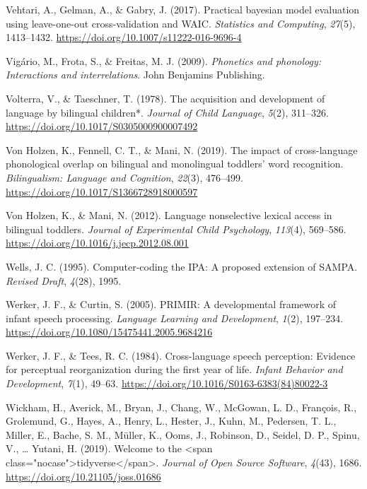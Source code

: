 \documentclass[
  man,
  floatsintext,
  colorlinks=true,linkcolor=blue,citecolor=blue,urlcolor=blue,biblatex]{apa7}
\newlength{\cslhangindent}
\newlength{\cslentryspacingunit} %
\newenvironment{CSLReferences}[2] %
 {%
  \setlength{\parindent}{0pt}
  \ifodd #1
  \let\oldpar\par
  \def\par{\hangindent=\cslhangindent\oldpar}
  \fi
  \setlength{\parskip}{#2\cslentryspacingunit}
 }%
 {}
\begin{document}
\begin{CSLReferences}{1}{0}
\leavevmode{}%
Vehtari, A., Gelman, A., \& Gabry, J. (2017). Practical bayesian model
evaluation using leave-one-out cross-validation and {WAIC}.
\emph{Statistics and Computing}, \emph{27}(5), 1413--1432.
\url{https://doi.org/10.1007/s11222-016-9696-4}

\leavevmode{}%
Vigário, M., Frota, S., \& Freitas, M. J. (2009). \emph{Phonetics and
phonology: Interactions and interrelations}. John Benjamins Publishing.

\leavevmode{}%
Volterra, V., \& Taeschner, T. (1978). The acquisition and development
of language by bilingual children*. \emph{Journal of Child Language},
\emph{5}(2), 311--326. \url{https://doi.org/10.1017/S0305000900007492}

\leavevmode{}%
Von Holzen, K., Fennell, C. T., \& Mani, N. (2019). The impact of
cross-language phonological overlap on bilingual and monolingual
toddlers' word recognition. \emph{Bilingualism: Language and Cognition},
\emph{22}(3), 476--499. \url{https://doi.org/10.1017/S1366728918000597}

\leavevmode{}%
Von Holzen, K., \& Mani, N. (2012). Language nonselective lexical access
in bilingual toddlers. \emph{Journal of Experimental Child Psychology},
\emph{113}(4), 569--586.
\url{https://doi.org/10.1016/j.jecp.2012.08.001}

\leavevmode{}%
Wells, J. C. (1995). Computer-coding the {IPA}: A proposed extension of
{SAMPA}. \emph{Revised Draft}, \emph{4}(28), 1995.

\leavevmode{}%
Werker, J. F., \& Curtin, S. (2005). {PRIMIR}: A developmental framework
of infant speech processing. \emph{Language Learning and Development},
\emph{1}(2), 197--234.
\url{https://doi.org/10.1080/15475441.2005.9684216}

\leavevmode{}%
Werker, J. F., \& Tees, R. C. (1984). Cross-language speech perception:
Evidence for perceptual reorganization during the first year of life.
\emph{Infant Behavior and Development}, \emph{7}(1), 49--63.
\url{https://doi.org/10.1016/S0163-6383(84)80022-3}

\leavevmode{}%
Wickham, H., Averick, M., Bryan, J., Chang, W., McGowan, L. D.,
François, R., Grolemund, G., Hayes, A., Henry, L., Hester, J., Kuhn, M.,
Pedersen, T. L., Miller, E., Bache, S. M., Müller, K., Ooms, J.,
Robinson, D., Seidel, D. P., Spinu, V., \ldots{} Yutani, H. (2019).
Welcome to the {\textless{}}span
class="nocase"{\textgreater{}}tidyverse{\textless{}}/span{\textgreater{}}.
\emph{Journal of Open Source Software}, \emph{4}(43), 1686.
\url{https://doi.org/10.21105/joss.01686}


\end{CSLReferences}
\end{document}

